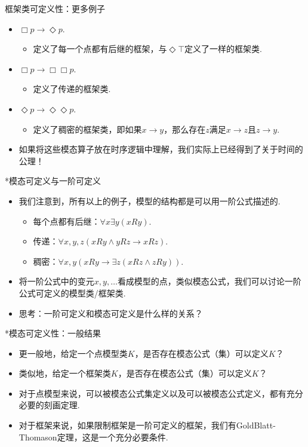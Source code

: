     
    {框架类可定义性：更多例子}
    \begin{itemize}
        \item $\Box p\to\Diamond p$.
        \begin{itemize}
            \item 定义了每一个点都有后继的框架，与$\Diamond\top$定义了一样的框架类.
        \end{itemize}
        \item $\Box p\to\Box\Box p$.
        \begin{itemize}
            \item 定义了传递的框架类.
        \end{itemize}
        \item $\Diamond p\to\Diamond \Diamond p$.
        \begin{itemize}
            \item 定义了稠密的框架类，即如果$x\to y$，那么存在$z$满足$x\to z$且$z\to y$.
        \end{itemize}
        \item 如果将这些模态算子放在时序逻辑中理解，我们实际上已经得到了关于时间的公理！%
    \end{itemize}
    
    
    {*模态可定义与一阶可定义}
    \begin{itemize}
        \item 我们注意到，所有以上的例子，模型的结构都是可以用一阶公式描述的.
        \begin{itemize}
            \item 每个点都有后继：$\forall x\exists y(xRy)$.
            \item 传递：$\forall x,y,z(xRy\wedge yRz\to xRz)$.
            \item 稠密：$\forall x,y(xRy\to\exists z(xRz\wedge zRy))$.
        \end{itemize}
        \item 将一阶公式中的变元$x,y,\dots$看成模型的点，类似模态公式，我们可以讨论一阶公式可定义的模型类/框架类.
        \item 思考：一阶可定义和模态可定义是什么样的关系？
    \end{itemize}
    
    
    {*模态可定义性：一般结果}
    \begin{itemize}
        \item 更一般地，给定一个点模型类$K$，是否存在模态公式（集）可以定义$K$？
        \item 类似地，给定一个框架类$K$，是否存在模态公式（集）可以定义$K$？
        \item 对于点模型来说，可以被模态公式集定义以及可以被模态公式定义，都有充分必要的刻画定理.
        \item 对于框架来说，如果限制框架是一阶可定义的框架，我们有GoldBlatt-Thomason定理，这是一个充分必要条件.
    \end{itemize}
    
\endgroup
